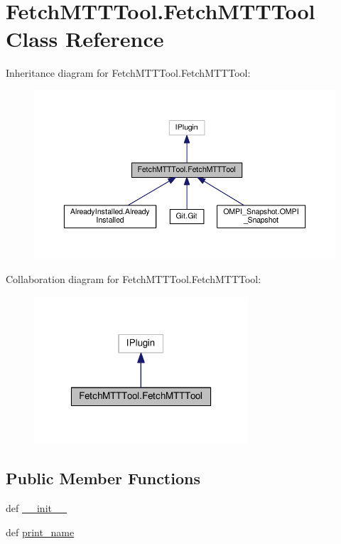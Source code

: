 \hypertarget{class_fetch_m_t_t_tool_1_1_fetch_m_t_t_tool}{\section{Fetch\-M\-T\-T\-Tool.\-Fetch\-M\-T\-T\-Tool Class Reference}
\label{class_fetch_m_t_t_tool_1_1_fetch_m_t_t_tool}
}


Inheritance diagram for Fetch\-M\-T\-T\-Tool.\-Fetch\-M\-T\-T\-Tool\-:
\nopagebreak
\begin{figure}[H]
\begin{center}
\leavevmode
\includegraphics[width=350pt]{class_fetch_m_t_t_tool_1_1_fetch_m_t_t_tool__inherit__graph}
\end{center}
\end{figure}


Collaboration diagram for Fetch\-M\-T\-T\-Tool.\-Fetch\-M\-T\-T\-Tool\-:
\nopagebreak
\begin{figure}[H]
\begin{center}
\leavevmode
\includegraphics[width=226pt]{class_fetch_m_t_t_tool_1_1_fetch_m_t_t_tool__coll__graph}
\end{center}
\end{figure}
\subsection*{Public Member Functions}
\begin{DoxyCompactItemize}
\item 
def \hyperlink{class_fetch_m_t_t_tool_1_1_fetch_m_t_t_tool_ac23a2c73d6f9eb2edcd7fcdae09c7b8c}{\-\_\-\-\_\-init\-\_\-\-\_\-}
\item 
def \hyperlink{class_fetch_m_t_t_tool_1_1_fetch_m_t_t_tool_a9b335ae2c3b15ef427fc70aa0510ae40}{print\-\_\-name}
\end{DoxyCompactItemize}


